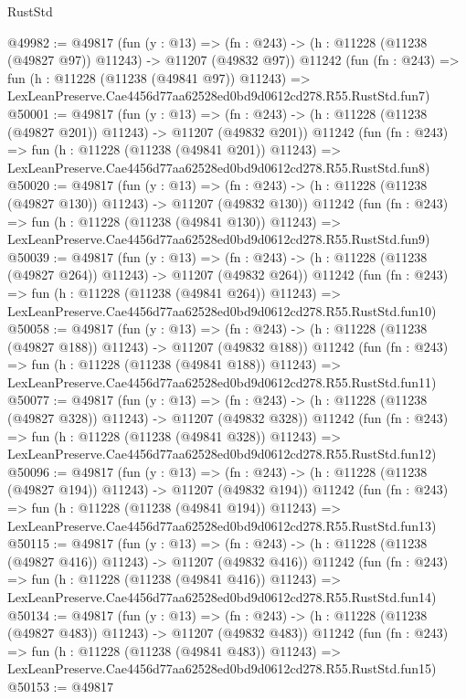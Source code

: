 \begin{lexlean}{RustStd}
\begin{coremodule}
@49982 := @49817
    (fun (y : @13) =>
    (fn : @243) -> (h : @11228 (@11238 (@49827 @97)) @11243) -> @11207 (@49832 @97))
    @11242
    (fun (fn : @243) =>
    fun (h : @11228 (@11238 (@49841 @97)) @11243) =>
    LexLeanPreserve.Cae4456d77aa62528ed0bd9d0612cd278.R55.RustStd.fun7)
@50001 := @49817
    (fun (y : @13) =>
    (fn : @243) -> (h : @11228 (@11238 (@49827 @201)) @11243) -> @11207 (@49832 @201))
    @11242
    (fun (fn : @243) =>
    fun (h : @11228 (@11238 (@49841 @201)) @11243) =>
    LexLeanPreserve.Cae4456d77aa62528ed0bd9d0612cd278.R55.RustStd.fun8)
@50020 := @49817
    (fun (y : @13) =>
    (fn : @243) -> (h : @11228 (@11238 (@49827 @130)) @11243) -> @11207 (@49832 @130))
    @11242
    (fun (fn : @243) =>
    fun (h : @11228 (@11238 (@49841 @130)) @11243) =>
    LexLeanPreserve.Cae4456d77aa62528ed0bd9d0612cd278.R55.RustStd.fun9)
@50039 := @49817
    (fun (y : @13) =>
    (fn : @243) -> (h : @11228 (@11238 (@49827 @264)) @11243) -> @11207 (@49832 @264))
    @11242
    (fun (fn : @243) =>
    fun (h : @11228 (@11238 (@49841 @264)) @11243) =>
    LexLeanPreserve.Cae4456d77aa62528ed0bd9d0612cd278.R55.RustStd.fun10)
@50058 := @49817
    (fun (y : @13) =>
    (fn : @243) -> (h : @11228 (@11238 (@49827 @188)) @11243) -> @11207 (@49832 @188))
    @11242
    (fun (fn : @243) =>
    fun (h : @11228 (@11238 (@49841 @188)) @11243) =>
    LexLeanPreserve.Cae4456d77aa62528ed0bd9d0612cd278.R55.RustStd.fun11)
@50077 := @49817
    (fun (y : @13) =>
    (fn : @243) -> (h : @11228 (@11238 (@49827 @328)) @11243) -> @11207 (@49832 @328))
    @11242
    (fun (fn : @243) =>
    fun (h : @11228 (@11238 (@49841 @328)) @11243) =>
    LexLeanPreserve.Cae4456d77aa62528ed0bd9d0612cd278.R55.RustStd.fun12)
@50096 := @49817
    (fun (y : @13) =>
    (fn : @243) -> (h : @11228 (@11238 (@49827 @194)) @11243) -> @11207 (@49832 @194))
    @11242
    (fun (fn : @243) =>
    fun (h : @11228 (@11238 (@49841 @194)) @11243) =>
    LexLeanPreserve.Cae4456d77aa62528ed0bd9d0612cd278.R55.RustStd.fun13)
@50115 := @49817
    (fun (y : @13) =>
    (fn : @243) -> (h : @11228 (@11238 (@49827 @416)) @11243) -> @11207 (@49832 @416))
    @11242
    (fun (fn : @243) =>
    fun (h : @11228 (@11238 (@49841 @416)) @11243) =>
    LexLeanPreserve.Cae4456d77aa62528ed0bd9d0612cd278.R55.RustStd.fun14)
@50134 := @49817
    (fun (y : @13) =>
    (fn : @243) -> (h : @11228 (@11238 (@49827 @483)) @11243) -> @11207 (@49832 @483))
    @11242
    (fun (fn : @243) =>
    fun (h : @11228 (@11238 (@49841 @483)) @11243) =>
    LexLeanPreserve.Cae4456d77aa62528ed0bd9d0612cd278.R55.RustStd.fun15)
@50153 := @49817

\end{coremodule}
\end{lexlean}
